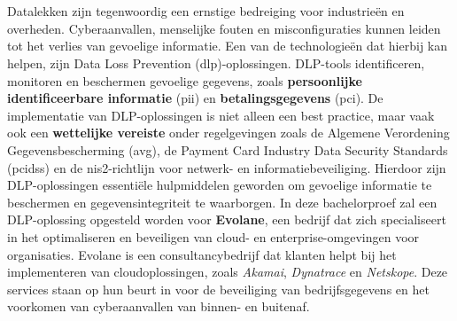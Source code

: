 
\chapter{}%
\label{ch:inleiding}


Datalekken zijn tegenwoordig een ernstige bedreiging voor industrieën en overheden. 
Cyberaanvallen, menselijke fouten en misconfiguraties kunnen leiden tot het verlies van gevoelige informatie. 
Een van de technologieën dat hierbij kan helpen, zijn Data Loss Prevention (\gls{dlp})-oplossingen.
DLP-tools identificeren, monitoren en beschermen gevoelige gegevens, zoals \textbf{persoonlijke identificeerbare informatie} (\gls{pii}) en \textbf{betalingsgegevens} (\gls{pci}). 
De implementatie van DLP-oplossingen is niet alleen een best practice, maar vaak ook een \textbf{wettelijke vereiste} onder regelgevingen zoals de 
Algemene Verordening Gegevensbescherming (\gls{avg}), de Payment Card Industry Data Security Standards (\gls{pcidss}) en de \gls{nis2}-richtlijn voor netwerk- en informatiebeveiliging.
Hierdoor zijn DLP-oplossingen essentiële hulpmiddelen geworden om gevoelige informatie te beschermen en gegevensintegriteit te waarborgen. 
In deze bachelorproef zal een DLP-oplossing opgesteld worden voor \textbf{Evolane}, een bedrijf dat zich specialiseert in het optimaliseren en beveiligen van cloud- en enterprise-omgevingen voor organisaties. 
Evolane is een consultancybedrijf dat klanten helpt bij het implementeren van cloudoplossingen, zoals \textit{Akamai}, \textit{Dynatrace} en \textit{Netskope}. 
Deze services staan op hun beurt in voor de beveiliging van bedrijfsgegevens en het voorkomen van cyberaanvallen van binnen- en buitenaf. 

